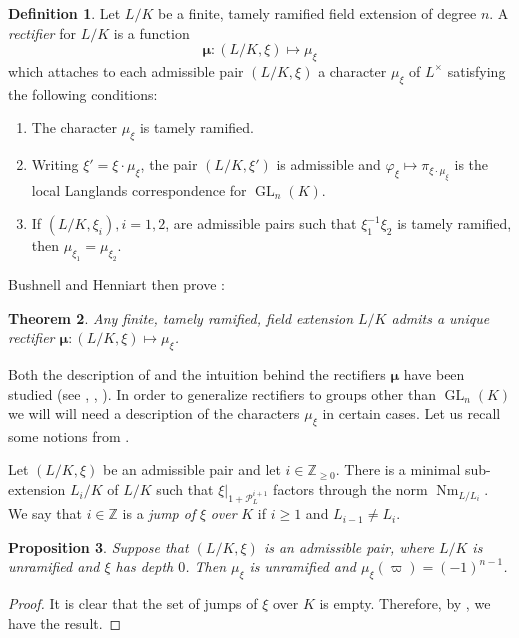 \documentclass{compositio}
\theoremstyle{plain}
\newtheorem{theorem}{Theorem}[section]
\newtheorem{proposition}[theorem]{Proposition}
\theoremstyle{definition}
\newtheorem{definition}[theorem]{Definition}
\DeclareMathOperator{\Nm}{Nm}
\DeclareMathOperator{\GL}{GL}
\newcommand{\PL}{\mathcal{P}_L}
\newcommand{\ZZ}{\mathbb{Z}}
\newcommand{\bmu}{\boldsymbol\mu}
\begin{document}
\begin{definition}\label{rectifierbushnellhenniart}
Let $L/K$ be a finite, tamely ramified field extension of degree $n$.  A \emph{rectifier}
for $L/K$ is a function
$$\bmu : (L/K, \xi) \mapsto \mu_{\xi}$$
which attaches to each admissible pair $(L/K, \xi)$ a character $\mu_{\xi}$ of $L^{\times}$
satisfying the following conditions:
\begin{enumerate}
\item The character $\mu_{\xi}$ is tamely ramified.
\item Writing $\xi' = \xi \cdot \mu_{\xi}$, the pair $(L/K, \xi')$ is admissible and
$\varphi_{\xi} \mapsto \pi_{\xi \cdot \mu_{\xi}}$ is the local Langlands correspondence
for $\GL_n(K)$.
\item If $(L/K, \xi_i), i = 1,2$, are admissible pairs such that $\xi_1^{-1} \xi_2$ is
tamely ramified, then $ \mu_{\xi_1} =  \mu_{\xi_2}$.
\end{enumerate}
\end{definition}

Bushnell and Henniart then prove \cite[Thm. A]{bushnell-henniart:10a}:

\begin{theorem}
Any finite, tamely ramified, field extension $L/K$ admits a unique rectifier
$\bmu : (L/K, \xi) \mapsto \mu_{\xi}$.
\end{theorem}

Both the description of and the
intuition behind the rectifiers $\bmu$ have been
studied (see \cite{bushnell-henniart:10a}, \cite{tam:12a}, \cite{adrian:13a}).  In order to
generalize rectifiers to groups other than $\GL_n(K)$ we
will will need a description of the characters $\mu_{\xi}$ in certain cases.
Let us recall some notions from \cite[\S8]{bushnell-henniart:10a}.

Let $(L/K,\xi)$ be an admissible pair and let $i \in \ZZ_{\ge 0}$.
There is a minimal sub-extension $L_i/K$ of $L/K$ such that
$\xi|_{1 + \PL^{i+1}}$ factors through the norm $\Nm_{L/L_i}$.  We say that $i \in \mathbb{Z}$
is a \emph{jump of} $\xi$ \emph{over} $K$ if $i \geq 1$ and $L_{i-1} \neq L_i$.

\begin{proposition}\label{prop:BH_result1}
  Suppose that $(L/K, \xi)$ is an admissible pair, where $L/K$
  is unramified and $\xi$ has depth $0$.
  Then $\mu_{\xi}$ is unramified and
  $\mu_{\xi}(\varpi) = (-1)^{n-1}$.
\end{proposition}

\begin{proof}
It is clear that the set of jumps of $\xi$ over $K$ is empty.
Therefore, by \cite[Proposition 21]{bushnell-henniart:10a}, we have the result.
\end{proof}
\end{document}
